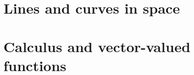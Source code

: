 \documentclass[9pt]{xourse}
\begin{document}
\part{Lines and curves in space} 



\part{Calculus and vector-valued functions}
\end{document}
